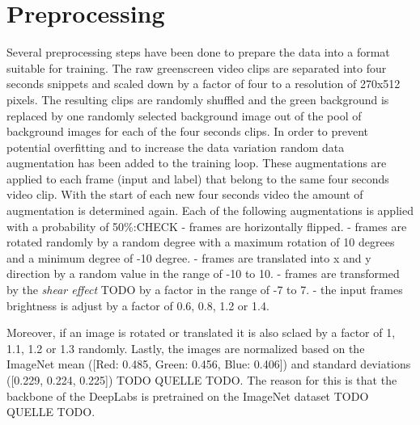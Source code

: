 \documentclass[11pt,
  paper=a4, 
  bibliography=totocnumbered,
	captions=tableheading,
	BCOR=10mm
]{scrreprt}
\theoremstyle{definition}
\begin{document}
\section{Preprocessing}\label{sec:Preprocessing}
Several preprocessing steps have been done to prepare the data into a format suitable for training.
The raw greenscreen video clips are separated into four seconds snippets and scaled down by a factor of four to a resolution of 270x512 pixels.
The resulting clips are randomly shuffled and the green background is replaced by one randomly selected background image out of the pool of background images for each of the four seconds clips.
In order to prevent potential overfitting and to increase the data variation random data augmentation has been added to the training loop.
These augmentations are applied to each frame (input and label) that belong to the same four seconds video clip.
With the start of each new four seconds video the amount of augmentation is determined again.
Each of the following augmentations is applied with a probability of 50\%:CHECK
- frames are horizontally flipped.
- frames are rotated randomly by a random degree with a maximum rotation of 10 degrees and a minimum degree of -10 degree. %
- frames are translated into x and y direction by a random value in the range of -10 to 10.
- frames are transformed by the \textit{shear effect} TODO by a factor in the range of -7 to 7.
- the input frames brightness is adjust by a factor of 0.6, 0.8, 1.2 or 1.4.

Moreover, if an image is rotated or translated it is also sclaed by a factor of 1, 1.1, 1.2 or 1.3 randomly.
Lastly, the images are normalized based on the ImageNet mean ([Red: 0.485, Green: 0.456, Blue: 0.406]) and standard deviations ([0.229, 0.224, 0.225]) TODO QUELLE TODO.
The reason for this is that the backbone of the DeepLabs is pretrained on the ImageNet dataset TODO QUELLE TODO.
\end{document}
